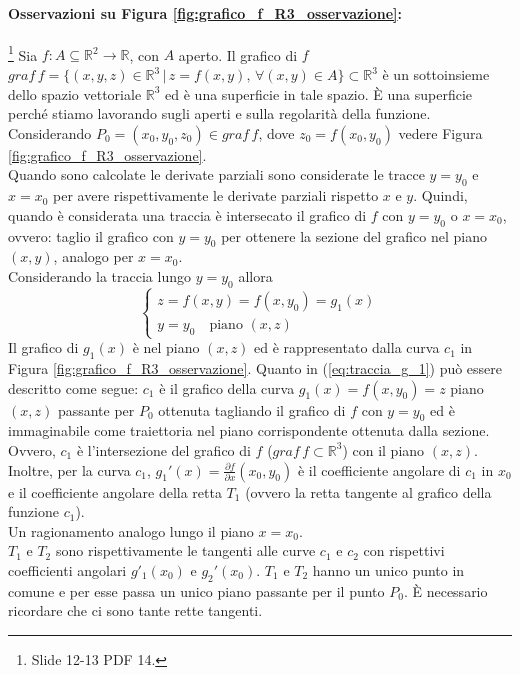 \paragraph{Osservazioni su Figura \ref{fig:grafico_f_R3_osservazione}:}\footnote{Slide 12-13 PDF 14.}
Sia $f\colon A\subseteq\mathbb R^2\rightarrow\mathbb R$, con $A$ aperto. Il grafico di $f$ $graf\,f=\{(x,y,z)\in\mathbb R^3\,|\, z=f(x,y),\, \forall (x,y)\in A\}\subset\mathbb R^3$ è un sottoinsieme dello spazio vettoriale $\mathbb R^3$ ed è una superficie in tale spazio. È una superficie perché stiamo lavorando sugli aperti e sulla regolarità della funzione.\\
Considerando $P_0=(x_0,y_0,z_0)\in graf\, f$, dove $z_0=f(x_0,y_0)$ vedere Figura \ref{fig:grafico_f_R3_osservazione}.\\
Quando sono calcolate le derivate parziali sono considerate le tracce $y=y_0$ e $x=x_0$ per avere rispettivamente le derivate parziali rispetto $x$ e $y$. Quindi, quando è considerata una traccia è intersecato il grafico di $f$ con $y=y_0$ o $x=x_0$, ovvero: taglio il grafico con $y=y_0$ per ottenere la sezione del grafico nel piano $(x,y)$, analogo per $x=x_0$.\\
Considerando la traccia lungo $y=y_0$ allora
\begin{equation}\label{eq:traccia_g_1}
    \begin{cases}
        z=f(x,y)=f(x,y_0)=g_1(x)\\
        y=y_0\quad \text{piano }(x,z)
    \end{cases}
\end{equation}
Il grafico di $g_1(x)$ è nel piano $(x,z)$ ed è rappresentato dalla curva $c_1$ in Figura \ref{fig:grafico_f_R3_osservazione}. Quanto in (\ref{eq:traccia_g_1}) può essere descritto come segue: $c_1$ è il grafico della curva $g_1(x)=f(x,y_0)=z$ piano $(x,z)$ passante per $P_0$ ottenuta tagliando il grafico di $f$ con $y=y_0$ ed è immaginabile come traiettoria nel piano corrispondente ottenuta dalla sezione. Ovvero, $c_1$ è l'intersezione del grafico di $f$ ($graf\, f\subset\mathbb R^3$) con il piano $(x,z)$. Inoltre, per la curva $c_1$, $g_1'(x)=\frac{\partial f}{\partial x}(x_0,y_0)$ è il coefficiente angolare di $c_1$ in $x_0$ e il coefficiente angolare della retta $T_1$ (ovvero la retta tangente al grafico della funzione $c_1$).\\
Un ragionamento analogo lungo il piano $x=x_0$.\\
 $T_1$ e $T_2$ sono rispettivamente le tangenti alle curve $c_1$ e $c_2$ con rispettivi coefficienti angolari $g'_1(x_0)$ e $g_2'(x_0)$. $T_1$ e $T_2$ hanno un unico punto in comune e per esse passa un unico piano passante per il punto $P_0$. È necessario ricordare che ci sono tante rette tangenti.\\

